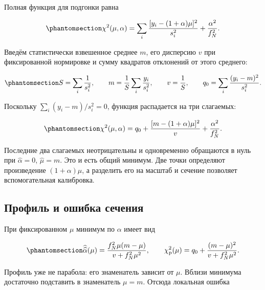 \documentclass[
  russian,
  11pt,
  a4paper,
  open=any]{scrbook}
\begin{document}
Полная функция для подгонки равна

\begin{equation}\protect\phantomsection\label{eq-ch12-normalization-penalty}{
\chi^2(\mu,\alpha)
=\sum_i\frac{[y_i-(1+\alpha)\mu]^2}{s_i^2}
+\frac{\alpha^2}{f_N^2}.
}\end{equation}

Введём статистически взвешенное среднее \(m\), его дисперсию \(v\) при
фиксированной нормировке и сумму квадратов отклонений от этого среднего:

\begin{equation}\protect\phantomsection\label{eq-ch12-normalization-statistical-sums}{
S=\sum_i\frac1{s_i^2},\qquad
m=\frac1S\sum_i\frac{y_i}{s_i^2},\qquad
v=\frac1S,\qquad
q_0=\sum_i\frac{(y_i-m)^2}{s_i^2}.
}\end{equation}

Поскольку \(\sum_i(y_i-m)/s_i^2=0\), функция распадается на три
слагаемых:

\begin{equation}\protect\phantomsection\label{eq-ch12-normalization-decomposition}{
\chi^2(\mu,\alpha)
=q_0+\frac{[m-(1+\alpha)\mu]^2}{v}
+\frac{\alpha^2}{f_N^2}.
}\end{equation}

Последние два слагаемых неотрицательны и одновременно обращаются в нуль
при \(\widehat\alpha=0\), \(\widehat\mu=m\). Это и есть общий минимум.
Две точки определяют произведение \((1+\alpha)\mu\), а разделить его на
масштаб и сечение позволяет вспомогательная калибровка.

\subsection{Профиль и ошибка
сечения}\label{ux43fux440ux43eux444ux438ux43bux44c-ux438-ux43eux448ux438ux431ux43aux430-ux441ux435ux447ux435ux43dux438ux44f}

При фиксированном \(\mu\) минимум по \(\alpha\) имеет вид

\begin{equation}\protect\phantomsection\label{eq-ch12-normalization-profile}{
\widehat{\widehat\alpha}(\mu)
=\frac{f_N^2\mu(m-\mu)}{v+f_N^2\mu^2},
\qquad
\chi^2_{\mathrm p}(\mu)
=q_0+\frac{(m-\mu)^2}{v+f_N^2\mu^2}.
}\end{equation}

Профиль уже не парабола: его знаменатель зависит от \(\mu\). Вблизи
минимума достаточно подставить в знаменатель \(\mu=m\). Отсюда локальная
ошибка
\end{document}
